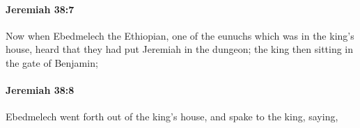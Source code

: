 		\paragraph{Jeremiah 38:7} %
			\label{JEREMIAH-38-7}

			Now when Ebedmelech the Ethiopian, one of the eunuchs which was in the king’s house, heard that they had put Jeremiah in the dungeon; the king then sitting in the gate of Benjamin;


		\paragraph{Jeremiah 38:8} %
			\label{JEREMIAH-38-8}

			Ebedmelech went forth out of the king’s house, and spake to the king, saying,


